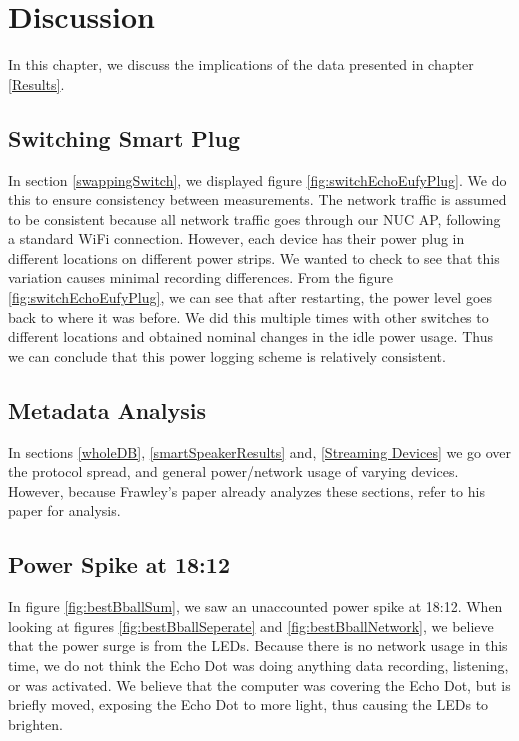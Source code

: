 \chapter{Discussion}
\label{Discussion}
In this chapter, we discuss the implications of the data presented in chapter \ref{Results}.

\section{Switching Smart Plug}
In section \ref{swappingSwitch}, we displayed figure \ref{fig:switchEchoEufyPlug}. We do this to ensure consistency between measurements. The network traffic is assumed to be consistent because all network traffic goes through our NUC AP, following a standard WiFi connection. However, each device has their power plug in different locations on different power strips. We wanted to check to see that this variation causes minimal recording differences. From the figure \ref{fig:switchEchoEufyPlug}, we can see that after restarting, the power level goes back to where it was before. We did this multiple times with other switches to different locations and obtained nominal changes in the idle power usage. Thus we can conclude that this power logging scheme is relatively consistent.

\section{Metadata Analysis}
In sections \ref{wholeDB}, \ref{smartSpeakerResults} and, \ref{Streaming Devices} we go over the protocol spread, and general power/network usage of varying devices. However, because Frawley's paper \cite{frawley_2018} already analyzes these sections, refer to his paper for analysis.

\section{Power Spike at 18:12}
In figure \ref{fig:bestBballSum}, we saw an unaccounted power spike at 18:12. When looking at figures \ref{fig:bestBballSeperate} and \ref{fig:bestBballNetwork}, we believe that the power surge is from the LEDs. Because there is no network usage in this time, we do not think the Echo Dot was doing anything data recording, listening, or was activated. We believe that the computer was covering the Echo Dot, but is briefly moved, exposing the Echo Dot to more light, thus causing the LEDs to brighten.

